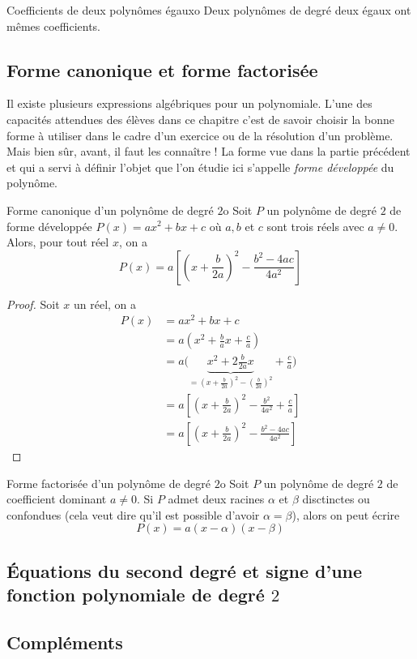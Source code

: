\begin{proposition}{Coefficients de deux polynômes égaux}{o}
	Deux polynômes de degré deux égaux ont mêmes coefficients.
\end{proposition}

\subsection{Forme canonique et forme factorisée}
Il existe plusieurs expressions algébriques pour un polynomiale. L'une des capacités attendues des élèves dans ce chapitre c'est de savoir choisir la bonne forme à utiliser dans le cadre d'un exercice ou de la résolution d'un problème. Mais bien sûr, avant, il faut les connaître ! La forme vue dans la partie précédent et qui a servi à définir l'objet que l'on étudie ici s'appelle \textit{forme développée} du polynôme. 

\begin{proposition}{Forme canonique d'un polynôme de degré $2$}{o}
Soit $P$ un polynôme de degré $2$ de forme développée $P(x)=ax^2+bx+c$ où $a,b$ et $c$ sont trois réels avec $a\neq 0$. Alors, pour tout réel $x$, on a 
\[P(x)=a\left[\left(x+\frac b{2a}\right)^2-\frac{b^2-4ac}{4a^2}\right]\]
\end{proposition}

\begin{proof}
	Soit $x$ un réel, on a 
	\begin{align*}
		P(x) &= ax^2+bx+c\\
			 &= a\left(x^2+\frac bax+\frac ca\right)\\
			 &= a\Big(\underbrace{x^2+2\frac b{2a}x}_{=\left(x+\frac b{2a}\right)^2-\left(\frac b{2a}\right)^2}+\frac ca\Big)\\
			 &= a\left[\left(x+\frac b{2a}\right)^2-\frac{b^2}{4a^2}+\frac ca\right]\\
			 &= a\left[\left(x+\frac b{2a}\right)^2-\frac{b^2-4ac}{4a^2}\right]
	\end{align*}
\end{proof}

\begin{proposition}{Forme factorisée d'un polynôme de degré $2$}{o}
	Soit $P$ un polynôme de degré $2$ de coefficient dominant $a\neq 0$. Si $P$ admet deux racines $\alpha$ et $\beta$ disctinctes ou confondues (cela veut dire qu'il est possible d'avoir $\alpha=\beta$), alors on peut écrire \[P(x)=a(x-\alpha)(x-\beta)\]
\end{proposition}

\subsection{Équations du second degré et signe d'une fonction polynomiale de degré $2$}

\subsection{Compléments}

